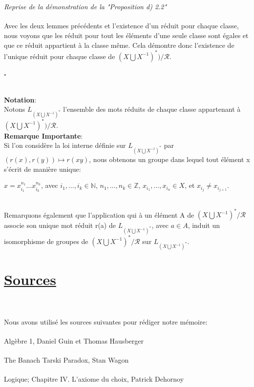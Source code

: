 \documentclass{article}
\begin{document}
\hline \\~\\

\textit{Reprise de la démonstration de la "Proposition d) 2.2"}\\~\\

Avec les deux lemmes précédents et l'existence d'un réduit pour chaque classe, nous voyons que les réduit pour tout les éléments d'une seule classe sont égales et que ce réduit appartient à la classe même. 
Cela démontre donc l'existence de l'unique réduit pour chaque classe de $(X\bigcup X^{-1})^{*})/\mathcal{R}$.\\
\begin{flushright}
$\square$
\end{flushright}\\

\textbf{Notation}:\\

Notons $L_{(X\bigcup X^{-1})^{*}}$ l'ensemble des mots réduits de chaque classe appartenant à $(X\bigcup X^{-1})^{*})/\mathcal{R}$.\\

\warning \hspace{0.1cm} \textbf{Remarque Importante}:\\

Si l'on considère la loi interne définie sur $L_{(X\bigcup X^{-1})^{*}}$ par $(r(x),r(y)) \longmapsto r(xy)$, nous obtenons un groupe dans lequel tout élément x s'écrit de manière unique:
\begin{center}
    $x=x_{i_1}^{n_1} \dots x_{i_k}^{n_k}$, \hspace{0.1cm}avec $i_1, \dots, i_k \in \mathbb{N}$, \hspace{0.1cm} $n_1, \dots, n_k \in \mathbb{Z}$, \hspace{0.1cm} $x_{i_1}, \dots, x_{i_n} \in X$, et $x_{i_j} \neq x_{i_{j+1}}$.
\end{center}\\

Remarquons également que l'application qui à un élément A de $(X\bigcup X^{-1})^{*}/\mathcal{R}$ associe son unique mot réduit r(a) de $L_{(X\bigcup X^{-1})^{*}}$, avec $a \in A$, induit un isomorphisme de groupes de $(X\bigcup X^{-1})^{*}/\mathcal{R}$ sur $L_{(X\bigcup X^{-1})^{*}}$.\\
\pagebreak

\section{\underline{Sources}}\\~\\

Nous avons utilisé les sources suivantes pour rédiger notre mémoire:\\~\\

Algèbre 1, Daniel Guin et Thomas Hausberger
\\~\\
The Banach Tarski Paradox, Stan Wagon
\\~\\
Logique; Chapitre IV. L’axiome du choix, Patrick Dehornoy
\end{document}
